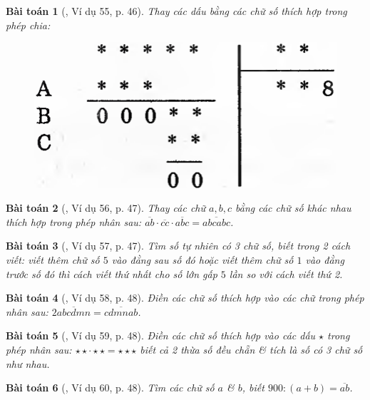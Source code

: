 \documentclass{article}
\numberwithin{equation}{section}
\newtheorem{baitoan}{Bài toán}
\begin{document}
\begin{baitoan}[\cite{Binh_Toan_6_tap_1}, Ví dụ 55, p. 46]
	Thay các dấu {\bf*} bằng các chữ số thích hợp trong phép chia:
	\begin{figure}[H]
		\centering
		\includegraphics[scale=0.13]{Binh_vi_du_55_p_47}
	\end{figure}
\end{baitoan}

\begin{baitoan}[\cite{Binh_Toan_6_tap_1}, Ví dụ 56, p. 47]
	Thay các chữ $a,b,c$ bằng các chữ số khác nhau thích hợp trong phép nhân sau: $\overline{ab}\cdot\overline{cc}\cdot\overline{abc} = \overline{abcabc}$.
\end{baitoan}

\begin{baitoan}[\cite{Binh_Toan_6_tap_1}, Ví dụ 57, p. 47]
	Tìm số tự nhiên có 3 chữ số, biết trong 2 cách viết: viết thêm chữ số $5$ vào đằng sau số đó hoặc viết thêm chữ số $1$ vào đằng trước số đó thì cách viết thứ nhất cho số lớn gấp $5$ lần so với cách viết thứ 2.
\end{baitoan}

\begin{baitoan}[\cite{Binh_Toan_6_tap_1}, Ví dụ 58, p. 48]
	Điền các chữ số thích hợp vào các chữ trong phép nhân sau: $2\overline{abcdmn} = \overline{cdmnab}$.
\end{baitoan}

\begin{baitoan}[\cite{Binh_Toan_6_tap_1}, Ví dụ 59, p. 48]
	Điền các chữ số thích hợp vào các dấu $\star$ trong phép nhân sau: $\star\star\cdot\star\star = \star\star\star$ biết cả 2 thừa số đều chẵn \& tích là số có 3 chữ số như nhau.
\end{baitoan}

\begin{baitoan}[\cite{Binh_Toan_6_tap_1}, Ví dụ 60, p. 48]
	Tìm các chữ số $a$ \& $b$, biết $900:(a + b) = \overline{ab}$.
\end{baitoan}
\end{document}
